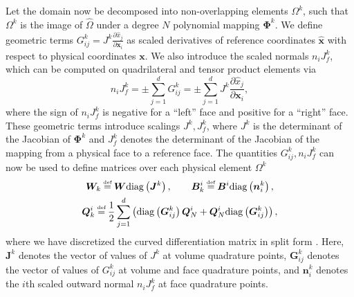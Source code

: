 \documentclass[onefignum,onetabnum,final]{siamart171218}
\renewcommand{\hat}{\widehat}
\newcommand{\pd}[2]{\frac{\partial#1}{\partial#2}}
\newcommand{\LRp}[1]{\left( #1 \right)}
\newcommand{\diag}[1]{{\rm diag}\LRp{#1}}
\newcommand\myeq{\mathrel{\stackrel{\makebox[0pt]{\mbox{\normalfont\tiny def}}}{=}}}
\begin{document}
Let the domain now be decomposed into non-overlapping elements $\Omega^k$, such that $\Omega^k$ is the image of $\hat{\Omega}$ under a degree $N$ polynomial mapping $\bm{\Phi}^k$.  We define geometric terms ${G}^k_{ij} = J^k\pd{\hat{x}_j}{\bm{x}_i}$ as scaled derivatives of reference coordinates $\hat{\bm{x}}$ with respect to physical coordinates $\bm{x}$.  We also introduce the scaled normals $n_iJ^k_f$, which can be computed on quadrilateral and tensor product elements via
\[
n_i J^k_f =\pm \sum_{j=1}^d G^k_{ij} = \pm \sum_{j=1}^d  J^k\pd{\hat{x}_j}{\bm{x}_i},
\]
where the sign of $n_i J^k_f$ is negative for a ``left'' face and positive for a ``right'' face.  
These geometric terms introduce scalings $J^k, J^k_f$, where $J^k$ is the determinant of the Jacobian of $\bm{\Phi}^k$ and $J^k_f$ denotes the determinant of the Jacobian of the mapping from a physical face to a reference face.  The quantities $G^k_{ij}, n_iJ^k_f$ can now be used to define matrices over each physical element $\Omega^k$ 
\begin{gather}
\bm{W}_k \myeq \bm{W} \diag{\bm{J}^k}, \qquad \bm{B}^i_k \myeq \bm{B}^i \diag{\bm{n}^k_i }, \nonumber\\
\bm{Q}^i_k \myeq \frac{1}{2} \sum_{j=1}^d \LRp{\diag{{\bm{G}}^k_{ij}}\bm{Q}^i_N  + \bm{Q}^i_N \diag{{\bm{G}}^k_{ij}} } \label{eq:splitcurv},
\end{gather}
where we have discretized the curved differentiation matrix in split form \cite{nordstrom2006conservative, kopriva2016geometry}.  
Here, $\bm{J}^k$ denotes the vector of values of $J^k$ at volume quadrature points, ${\bm{G}}^k_{ij}$ denotes the vector of values of ${G}^k_{ij}$ at volume and face quadrature points, and $\bm{n}^k_i$ denotes the $i$th scaled outward normal $n_i J^k_f$ at face quadrature points.  
\end{document}

